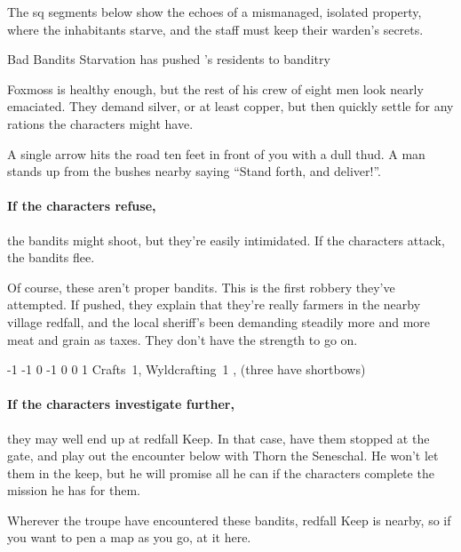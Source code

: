 The \gls{sq} \glspl{segment} below show the echoes of a mismanaged, isolated property, where the inhabitants starve, and the staff must keep their \gls{warden}'s secrets.

{Bad Bandits}%
{Starvation has pushed 's residents to banditry}%

Foxmoss is healthy enough, but the rest of his crew of eight men look nearly emaciated.
They demand silver, or at least copper, but then quickly settle for any rations the characters might have.

\begin{boxtext}
  A single arrow hits the road ten feet in front of you with a dull thud.
  A man stands up from the bushes nearby saying ``Stand forth, and deliver!''.
\end{boxtext}

\paragraph{If the characters refuse,}
the bandits might shoot, but they're easily intimidated.
If the characters attack, the bandits flee.

Of course, these aren't proper bandits.
This is the first robbery they've attempted.
If pushed, they explain that they're really farmers in the nearby village \gls{redfall}, and the local sheriff's been demanding steadily more and more meat and grain as taxes.
They don't have the strength to go on.


\setcounter{wounds}{3}
  {-1}%
  {-1}%
  {{0}%
  {-1}%
  {0}}%
  {0}%
  {1}%
  {Crafts~1, Wyldcrafting~1}%
  {\Dagger, (three have shortbows)}%
  {}

\paragraph{If the characters investigate further,}
they may well end up at \gls{redfall} Keep.
In that case, have them stopped at the gate, and play out the encounter below with Thorn the Seneschal.
He won't let them in the keep, but he will promise all he can if the characters complete the mission he has for them.

Wherever the troupe have encountered these bandits, \gls{redfall} Keep is nearby, so if you want to pen a map as you go, at it here.

